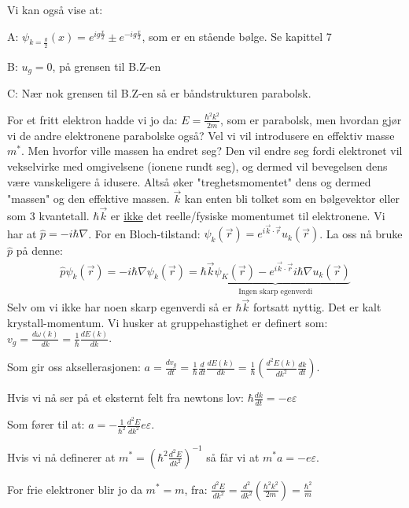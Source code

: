 \documentclass{article}
\begin{document}
Vi kan også vise at: 

A: $\psi_{k = \frac{g}{2}}(x) = e^{i g \frac{x}{2}} \pm e^{-ig\frac{x}{2}}$, som er en stående bølge. Se kapittel 7

B: $u_g = 0$, på grensen til B.Z-en

C: Nær nok grensen til B.Z-en så er båndstrukturen parabolsk.

For et fritt elektron hadde vi jo da: $E = \frac{\hbar^2 k^2}{2m}$, som er parabolsk, men hvordan gjør vi de andre elektronene parabolske også? Vel vi vil introdusere en effektiv masse $m^*$. Men hvorfor ville massen ha endret seg? Den vil endre seg fordi elektronet vil vekselvirke med omgivelsene (ionene rundt seg), og dermed vil bevegelsen dens være vanskeligere å idusere. Altså øker "treghetsmomentet" dens og dermed "massen" og den effektive massen.
$\vec{k}$ kan enten bli tolket som en bølgevektor eller som 3 kvantetall. $\hbar\vec{k}$ er \underline{ikke} det reelle/fysiske momentumet til elektronene. Vi har at $\hat{p} = -i \hbar \nabla$. For en Bloch-tilstand: $\psi_k(\vec{r}) = e^{i \vec{k} \cdot \vec{r}} u_k(\vec{r})$. La oss nå bruke $\hat{p}$ på denne:
\begin{align}
  \hat{p} \psi_k(\vec{r}) = -i \hbar \nabla \psi_k(\vec{r}) = \underbrace{\hbar \vec{k} \psi_K (\vec{r}) - e^{i \vec{k} \cdot \vec{r}} i \hbar \nabla u_k(\vec{r})}_{\text{Ingen skarp egenverdi}}
\end{align}
Selv om vi ikke har noen skarp egenverdi så er $\hbar \vec{k}$ fortsatt nyttig. Det er kalt krystall-momentum.
Vi husker at gruppehastighet er definert som: $v_g = \frac{d \omega(k)}{dk} = \frac{1}{\hbar} \frac{dE(k)}{dk}$.

Som gir oss aksellerasjonen: $a = \frac{d v_g}{dt} = \frac{1}{\hbar} \frac{d}{dt} \frac{dE(k)}{dk} = \frac{1}{\hbar}\left (\frac{d^2 E(k)}{dk^2} \frac{dk}{dt}\right)$.

Hvis vi nå ser på et eksternt felt fra newtons lov: $\hbar \frac{dk}{dt} = -e \varepsilon$

Som fører til at: $a = -\frac{1}{\hbar^2} \frac{d^2 E}{dk^2} e \varepsilon$.

Hvis vi nå definerer at $m^* = \left(\hbar^2 \frac{d^2 E}{dk^2}\right)^{-1}$ så får vi at $m^*a=-e\varepsilon$.

For frie elektroner blir jo da $m^* = m$, fra: $\frac{d^2 E}{dk^2} = \frac{d^2}{dk^2} \left(\frac{\hbar^2 k^2}{2m}\right) = \frac{\hbar^2}{m}$
\end{document}
